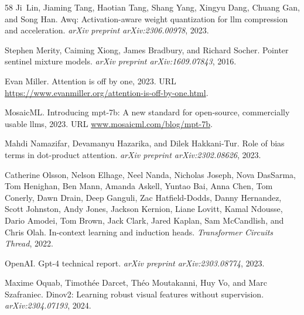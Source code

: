 \documentclass[10pt]{article}
\theoremstyle{definition}
\theoremstyle{plain}
\begin{document}
\begin{thebibliography}{58}
Ji~Lin, Jiaming Tang, Haotian Tang, Shang Yang, Xingyu Dang, Chuang Gan, and Song Han.
\newblock Awq: Activation-aware weight quantization for llm compression and acceleration.
\newblock \emph{arXiv preprint arXiv:2306.00978}, 2023.

Stephen Merity, Caiming Xiong, James Bradbury, and Richard Socher.
\newblock Pointer sentinel mixture models.
\newblock \emph{arXiv preprint arXiv:1609.07843}, 2016.

Evan Miller.
\newblock Attention is off by one, 2023.
\newblock URL \url{https://www.evanmiller.org/attention-is-off-by-one.html}.

MosaicML.
\newblock Introducing mpt-7b: A new standard for open-source, commercially usable llms, 2023.
\newblock URL \url{www.mosaicml.com/blog/mpt-7b}.

Mahdi Namazifar, Devamanyu Hazarika, and Dilek Hakkani-Tur.
\newblock Role of bias terms in dot-product attention.
\newblock \emph{arXiv preprint arXiv:2302.08626}, 2023.

Catherine Olsson, Nelson Elhage, Neel Nanda, Nicholas Joseph, Nova DasSarma, Tom Henighan, Ben Mann, Amanda Askell, Yuntao Bai, Anna Chen, Tom Conerly, Dawn Drain, Deep Ganguli, Zac Hatfield-Dodds, Danny Hernandez, Scott Johnston, Andy Jones, Jackson Kernion, Liane Lovitt, Kamal Ndousse, Dario Amodei, Tom Brown, Jack Clark, Jared Kaplan, Sam McCandlish, and Chris Olah.
\newblock In-context learning and induction heads.
\newblock \emph{Transformer Circuits Thread}, 2022.

OpenAI.
\newblock Gpt-4 technical report.
\newblock \emph{arXiv preprint arXiv:2303.08774}, 2023.

Maxime Oquab, Timothée Darcet, Théo Moutakanni, Huy Vo, and Marc Szafraniec.
\newblock Dinov2: Learning robust visual features without supervision.
\newblock \emph{arXiv:2304.07193}, 2024.


\end{thebibliography}
\end{document}
